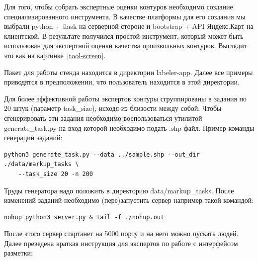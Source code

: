 \documentclass[12pt]{article}
\begin{document}
Для того, чтобы собрать экспертные оценки контуров необходимо создание специализированного инструмента. В качестве платформы для его создания мы выбрали python + flask на серверной стороне и bootstrap + API Яндекс.Карт на клиентской. В результате получился простой инструмент, который может быть использован для экспертной оценки качества произвольных контуров. Выглядит это как на картинке~\ref{tool-screen}.

Пакет для работы стенда находится в директории labeler-app. Далее все примеры приводятся в предположении, что пользователь находится в этой директории.

Для более эффективной работы экспертов контуры сгруппированы в задания по 20 штук (параметр \-\-task\_size), исходя из близости между собой. Чтобы сгенерировать эти задания необходимо воспользоваться утилитой generate\_task.py на вход которой необходимо подать .shp файл. Пример команды генерации заданий:
{\footnotesize
\begin{verbatim}
python3 generate_task.py --data ../sample.shp --out_dir ./data/markup_tasks \
	--task_size 20 -n 200
\end{verbatim}
}
Труды генератора надо положить в директорию data/markup\_tasks. После изменений заданий необходимо (пере)запустить сервер например такой командой:
{\footnotesize
\begin{verbatim}
nohup python3 server.py & tail -f ./nohup.out
\end{verbatim}
}
После этого сервер стартанет на 5000 порту и на него можно пускать людей. Далее преведена краткая инструкция для экспертов по работе с интерфейсом разметки:
\end{document}
